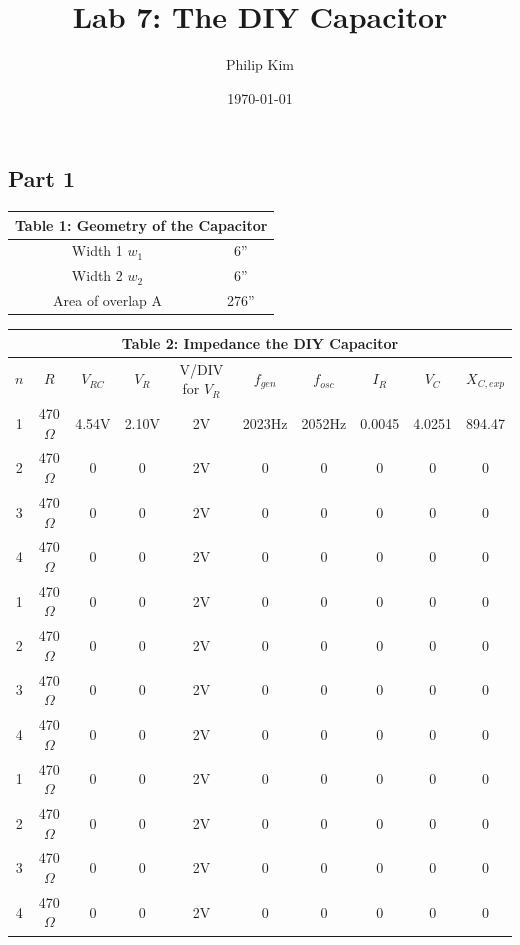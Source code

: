 \documentclass{article}
\title{Lab 7: The DIY Capacitor}
\author{Philip Kim}
\date{\today}
\begin{document}
\maketitle
\vspace*{-1cm}
\begin{table}[!htp]\centering
\subsection*{Part 1}
\begin{tabular}{|c|c|}\hline
  \multicolumn{2}{|c|}{\textbf{Table 1: Geometry of the Capacitor}} \\\hline
  Width 1 \(w_1\) & 6'' \\\hline
  Width 2 \(w_2\) & 6'' \\\hline
  Area of overlap A & 276'' \\\hline
  \end{tabular}
\end{table}

\begin{table}[!htp]\centering
  \begin{tabular}{|c|c|c|c|c|c|c|c|c|c|}\hline
    \multicolumn{10}{|c|}{\textbf{Table 2: Impedance the DIY Capacitor}} \\\hline
    \(n\) & \(R\) & \(V_{RC}\) & \(V_R\) & V/DIV for \(V_R\) & \(f_{gen}\) & \(f_{osc}\) & \(I_R\) & \(V_C\) & \(X_{C,exp}\) \\\hline
    1 & 470\(\Omega \) & 4.54V & 2.10V & 2V & 2023Hz & 2052Hz & 0.0045 & 4.0251 & 894.47 \\\hline
    2 & 470\(\Omega \) & 0 & 0 & 2V & 0 & 0 & 0 & 0 & 0 \\\hline
    3 & 470\(\Omega \) & 0 & 0 & 2V & 0 & 0 & 0 & 0 & 0 \\\hline
    4 & 470\(\Omega \) & 0 & 0 & 2V & 0 & 0 & 0 & 0 & 0 \\\hline
    1 & 470\(\Omega \) & 0 & 0 & 2V & 0 & 0 & 0 & 0 & 0 \\\hline
    2 & 470\(\Omega \) & 0 & 0 & 2V & 0 & 0 & 0 & 0 & 0 \\\hline
    3 & 470\(\Omega \) & 0 & 0 & 2V & 0 & 0 & 0 & 0 & 0 \\\hline
    4 & 470\(\Omega \) & 0 & 0 & 2V & 0 & 0 & 0 & 0 & 0 \\\hline
    1 & 470\(\Omega \) & 0 & 0 & 2V & 0 & 0 & 0 & 0 & 0 \\\hline
    2 & 470\(\Omega \) & 0 & 0 & 2V & 0 & 0 & 0 & 0 & 0 \\\hline
    3 & 470\(\Omega \) & 0 & 0 & 2V & 0 & 0 & 0 & 0 & 0 \\\hline
    4 & 470\(\Omega \) & 0 & 0 & 2V & 0 & 0 & 0 & 0 & 0 \\\hline
  \end{tabular}
\end{table}
\end{document}
